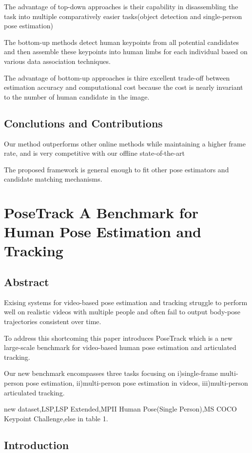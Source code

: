 \documentclass[11pt]{article}
\begin{document}
The advantage of top-down approaches is their capability in disassembling the task into multiple comparatively easier tasks(object detection and single-person pose estimation) 

The bottom-up methods detect human keypoints from all potential candidates and then assemble these keypoints into human limbs for each individual based on various data association techniques.

The advantage of bottom-up approaches is thire excellent trade-off between estimation accuracy and computational cost because the cost is nearly invariant to the number of human candidate in the image.


\subsection{Conclutions and Contributions}

Our method outperforms other online methods while maintaining a higher frame rate, and is very competitive with our offline state-of-the-art

The proposed framework is general enough to fit other pose estimators and candidate matching mechanisms.

\section{PoseTrack A Benchmark for Human Pose Estimation and Tracking}

\subsection{Abstract}

Exising systems for video-based pose estimation and tracking struggle to perform well on realistic videos with multiple people and often fail to output body-pose trajectories consistent over time.

To address this shortcoming this paper introduces PoseTrack which is a new large-scale benchmark for video-based human pose estimation and articulated tracking.

Our new benchmark encompasses three tasks focusing on i)single-frame multi-person pose estimation, ii)multi-person pose estimation in videos, iii)multi-person articulated tracking.

new dataset,LSP,LSP Extended,MPII Human Pose(Single Person),MS COCO Keypoint Challenge,else in table 1.

\subsection{Introduction}
\end{document}
